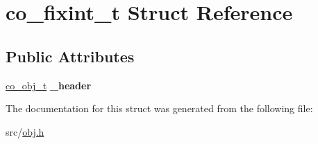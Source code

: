 \hypertarget{structco__fixint__t}{\section{co\-\_\-fixint\-\_\-t Struct Reference}
\label{structco__fixint__t}
}
\subsection*{Public Attributes}
\begin{DoxyCompactItemize}
\item 
\hypertarget{structco__fixint__t_a6d2de741ecbeb2d4c29555fba5945786}{\hyperlink{structco__obj__t}{co\-\_\-obj\-\_\-t} {\bfseries \-\_\-header}}\label{structco__fixint__t_a6d2de741ecbeb2d4c29555fba5945786}

\end{DoxyCompactItemize}


The documentation for this struct was generated from the following file\-:\begin{DoxyCompactItemize}
\item 
src/\hyperlink{obj_8h}{obj.\-h}\end{DoxyCompactItemize}
